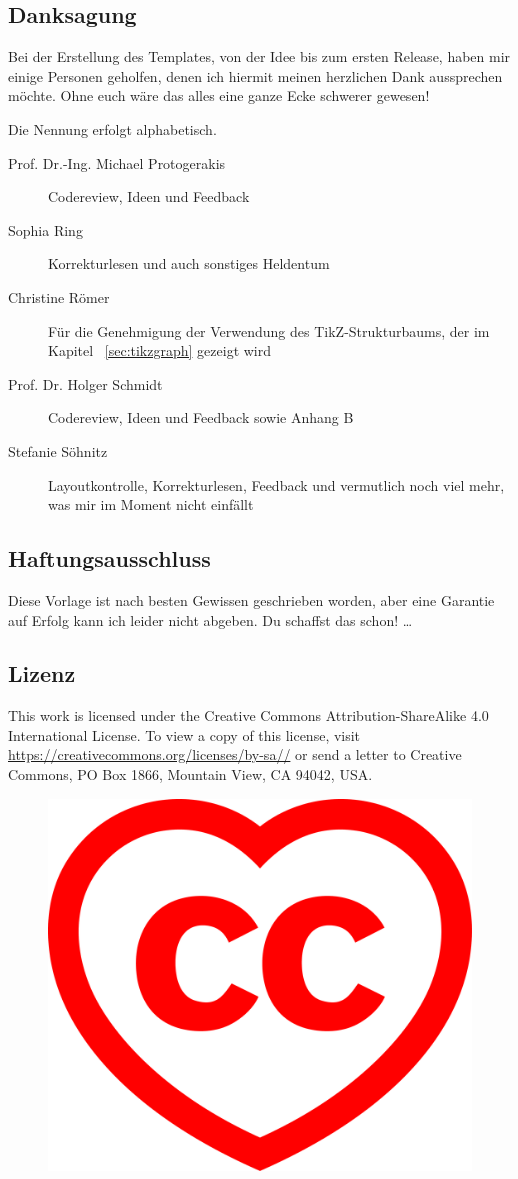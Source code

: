 \subsection{Danksagung}%
\label{sec:thx}
Bei der Erstellung des Templates, von der Idee bis zum ersten Release, haben mir einige Personen geholfen, denen ich hiermit meinen herzlichen Dank aussprechen möchte. Ohne euch wäre das alles eine ganze Ecke schwerer gewesen! 

Die Nennung erfolgt alphabetisch.
\begin{description}
  \item[Prof. Dr.-Ing. Michael Protogerakis] Codereview, Ideen und Feedback
  \item[Sophia Ring] Korrekturlesen und auch sonstiges Heldentum
  \item[Christine Römer] Für die Genehmigung der Verwendung des TikZ-Strukturbaums, der im Kapitel ~\ref{sec:tikzgraph} gezeigt wird
  \item[Prof. Dr. Holger Schmidt] Codereview, Ideen und Feedback sowie Anhang B
  \item[Stefanie Söhnitz] Layoutkontrolle, Korrekturlesen, Feedback und ver\-mut\-lich noch viel mehr, was mir im Moment nicht einfällt
\end{description}%
\subsection{Haftungsausschluss}%
\label{sec:haftausschl}
Diese Vorlage ist nach besten Gewissen geschrieben worden, aber eine Garantie auf Erfolg kann ich leider nicht abgeben. Du schaffst das schon!
\dots%
\subsection{Lizenz}%
\label{sec:licence}
This work is licensed under the Creative Commons Attribution-ShareAlike 4.0 International License. To view a copy of this license, visit \href{https://creativecommons.org/licenses/by-sa/4.0/}{https://creativecommons.org/\-licenses/\-by-sa//} or send a letter to Creative Commons, PO Box 1866, Mountain View, CA 94042, USA.
\begin{figure}[hb]
  \centering
  \includegraphics[width=0.5\columnwidth]{graphics/ccheart_red.pdf}
\end{figure}%
